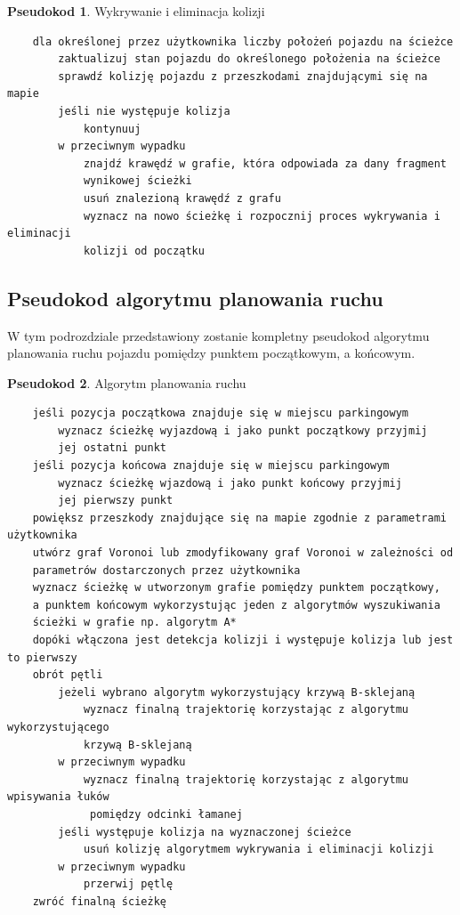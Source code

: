 \documentclass[a4paper,11pt,twoside]{report}
\theoremstyle{definition}
\newtheorem{pseudokod}{Pseudokod}[subsection]
\begin{document}
\newpage

\begin{pseudokod}
Wykrywanie i eliminacja kolizji
\begin{verbatim}
    dla określonej przez użytkownika liczby położeń pojazdu na ścieżce
        zaktualizuj stan pojazdu do określonego położenia na ścieżce
        sprawdź kolizję pojazdu z przeszkodami znajdującymi się na mapie
        jeśli nie występuje kolizja
            kontynuuj
        w przeciwnym wypadku
            znajdź krawędź w grafie, która odpowiada za dany fragment 
            wynikowej ścieżki
            usuń znalezioną krawędź z grafu
            wyznacz na nowo ścieżkę i rozpocznij proces wykrywania i eliminacji 
            kolizji od początku
\end{verbatim}
\end{pseudokod}

\subsection{Pseudokod algorytmu planowania ruchu}

W tym podrozdziale przedstawiony zostanie kompletny pseudokod algorytmu planowania ruchu pojazdu pomiędzy punktem początkowym, a końcowym.

\begin{pseudokod}
Algorytm planowania ruchu
\begin{verbatim}
    jeśli pozycja początkowa znajduje się w miejscu parkingowym
        wyznacz ścieżkę wyjazdową i jako punkt początkowy przyjmij 
        jej ostatni punkt
    jeśli pozycja końcowa znajduje się w miejscu parkingowym
        wyznacz ścieżkę wjazdową i jako punkt końcowy przyjmij 
        jej pierwszy punkt
    powiększ przeszkody znajdujące się na mapie zgodnie z parametrami użytkownika
    utwórz graf Voronoi lub zmodyfikowany graf Voronoi w zależności od 
    parametrów dostarczonych przez użytkownika
    wyznacz ścieżkę w utworzonym grafie pomiędzy punktem początkowy, 
    a punktem końcowym wykorzystując jeden z algorytmów wyszukiwania 
    ścieżki w grafie np. algorytm A*
    dopóki włączona jest detekcja kolizji i występuje kolizja lub jest to pierwszy 
    obrót pętli
        jeżeli wybrano algorytm wykorzystujący krzywą B-sklejaną
            wyznacz finalną trajektorię korzystając z algorytmu wykorzystującego 
            krzywą B-sklejaną
        w przeciwnym wypadku
            wyznacz finalną trajektorię korzystając z algorytmu wpisywania łuków
             pomiędzy odcinki łamanej
        jeśli występuje kolizja na wyznaczonej ścieżce
            usuń kolizję algorytmem wykrywania i eliminacji kolizji
        w przeciwnym wypadku
            przerwij pętlę
    zwróć finalną ścieżkę
\end{verbatim}
\end{pseudokod}
\end{document}
